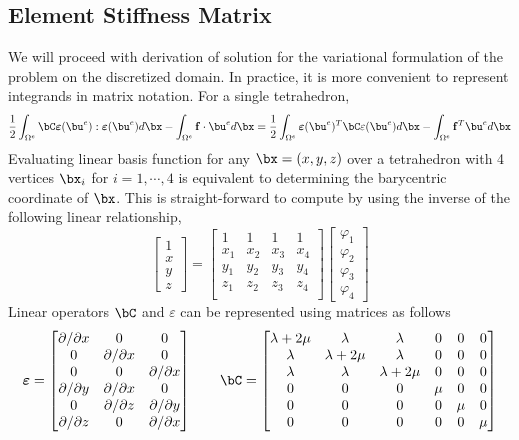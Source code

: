 \documentclass[11pt,titlepage]{article}
\newcommand{\bepsilon}{\boldsymbol{\varepsilon}}
\renewcommand{\epsilon}{\varepsilon}
\renewcommand{\bf}{\mathbf{f}}
\begin{document}
\subsection{Element Stiffness Matrix}

We will proceed with derivation of solution for the variational formulation of the problem on the discretized domain. In practice, it is more convenient to represent integrands in matrix notation. For a single tetrahedron,
\[
    \frac{1}{2}\int_{\Omega^e} \bC \bepsilon(\bu^e) : \bepsilon(\bu^e) d\bx 
    - \int_{\Omega^e} \bf \cdot\bu^e d\bx
    =
    \frac{1}{2} \int_{\Omega^e} \bepsilon(\bu^e)^T \bC \epsilon(\bu^e) d\bx
    - \int_{\Omega^e} \bf^T \bu^e d\bx
\]
Evaluating linear basis function for any $\bx = (x,y,z)$ over a tetrahedron with 4 vertices $\bx_i$ for $i=1,\cdots,4$ is equivalent to determining the barycentric coordinate of $\bx$. This is straight-forward to compute by using the inverse of the following linear relationship, 
\[
    \begin{bmatrix}
        1 \\ x \\ y \\ z 
    \end{bmatrix}
    = 
    \begin{bmatrix}
        1 & 1 & 1 & 1 \\
        x_1 & x_2 & x_3 & x_4 \\
        y_1 & y_2 & y_3 & y_4 \\
        z_1 & z_2 & z_3 & z_4 \\
    \end{bmatrix}
    \begin{bmatrix}
        \varphi_1 \\ \varphi_2 \\ \varphi_3 \\ \varphi_4
    \end{bmatrix}
\]
Linear operators $\bC$ and $\epsilon$ can be represented using matrices as follows 
\[
    \bepsilon = 
    \begin{bmatrix}
        \partial / \partial x & 0 & 0 \\
        0 & \partial / \partial x & 0 \\
        0 & 0 & \partial / \partial x \\
        \partial / \partial y & \partial /\partial x & 0 \\
        0 & \partial / \partial z & \partial /\partial y \\
        \partial / \partial z & 0 & \partial /\partial x \\
    \end{bmatrix}
    \quad\quad
    \bC = 
    \begin{bmatrix}
        \lambda + 2\mu & \lambda & \lambda & 0 & 0 & 0 \\
        \lambda & \lambda + 2\mu & \lambda & 0 & 0 & 0 \\
        \lambda & \lambda & \lambda + 2\mu & 0 & 0 & 0 \\
        0 & 0 & 0 & \mu & 0 & 0 \\
        0 & 0 & 0 & 0 & \mu & 0 \\
        0 & 0 & 0 & 0 & 0 & \mu \\
    \end{bmatrix}
\]
\end{document}
